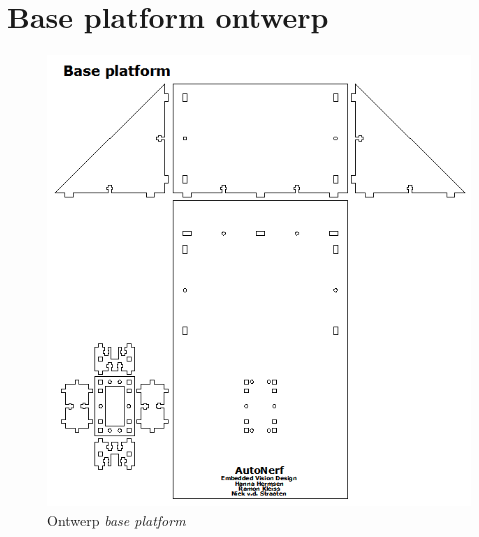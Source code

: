 \chapter{Base platform ontwerp}
\label{app:base}

\begin{figure}
    \includegraphics[scale=0.5]{figures/appendix/base.png}
    \caption{Ontwerp \emph{base platform}}
\end{figure}
